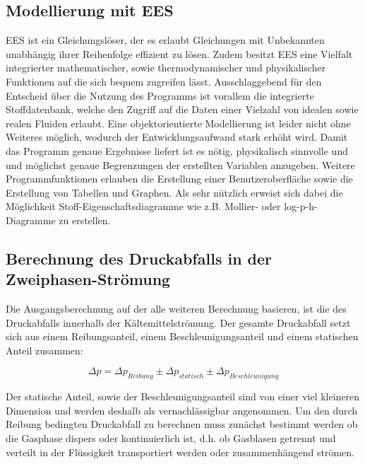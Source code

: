 \subsection{Modellierung mit EES}
\label{subsec:Modellierung mit EES}

EES ist ein Gleichungslöser, der es erlaubt Gleichungen mit Unbekannten unabhängig ihrer Reihenfolge effizient zu lösen. Zudem besitzt EES eine Vielfalt integrierter mathematischer, sowie thermodynamischer und physikalischer Funktionen auf die sich bequem zugreifen lässt\cite{Klein.2000}. Ausschlaggebend für den Entscheid über die Nutzung des Programms ist vorallem die integrierte Stoffdatenbank, welche den Zugriff auf die Daten einer Vielzahl von idealen sowie realen Fluiden erlaubt. Eine objektorientierte Modellierung ist leider nicht ohne Weiteres möglich, wodurch der Entwicklungsaufwand stark erhöht wird. Damit das Programm genaue Ergebnisse liefert ist es nötig, physikalisch sinnvolle und und möglichst genaue Begrenzungen der erstellten Variablen anzugeben. 
Weitere Programmfunktionen erlauben die Erstellung einer Benutzeroberfläche sowie die Erstellung von Tabellen und Graphen. Als sehr nützlich erweist sich dabei die Möglichkeit Stoff-Eigenschaftsdiagramme wie z.B. Mollier- oder log-p-h-Diagramme zu erstellen.



\subsection{Berechnung des Druckabfalls in der Zweiphasen-Strömung}
\label{subsec:Berechnung des Druckabfalls in der Zweiphasen-Strömung}

Die Ausgangsberechnung auf der alle weiteren Berechnung basieren, ist die des Druckabfalls innerhalb der Kältemittelströmung.
Der gesamte Druckabfall setzt sich aus einem Reibungsanteil, einem Beschleunigungsanteil und einem statischen Anteil zusammen\cite{SpringerVerlagGmbH.2013}:

\begin{equation}
\label{eq:10}
\Delta p =  \Delta p_{Reibung} \pm \Delta p_{statisch} \pm \Delta p_{Beschleunigung}
\end{equation}

Der statische Anteil, sowie der Beschleunigungsanteil sind von einer viel kleineren Dimension und werden deshalb als vernachlässigbar angenommen. Um den durch Reibung bedingten Druckabfall zu berechnen muss zunächst bestimmt werden ob die Gasphase dispers oder kontinuierlich ist, d.h. ob Gasblasen getrennt und verteilt in der Flüssigkeit transportiert werden oder zusammenhängend strömen.

